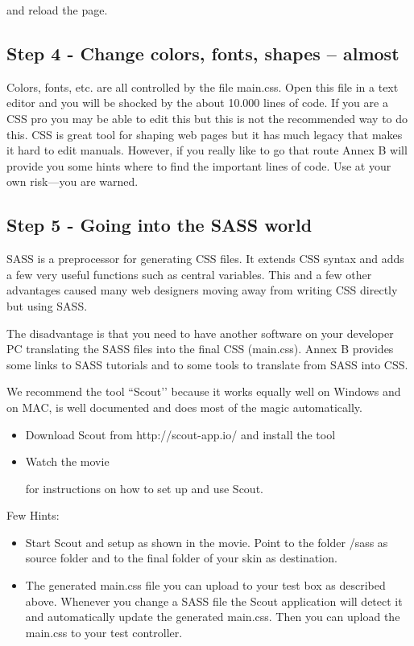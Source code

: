 and reload the page.

\subsection{Step 4 - Change colors, fonts, shapes – almost}

Colors, fonts, etc. are all controlled by the file main.css. Open this file in a text 
editor and you will be shocked by the about 10.000 lines of code. If you are a CSS pro 
you may be able to edit this but this is not the recommended way to do this. CSS is great
 tool for shaping web pages but it has much legacy that makes it hard to edit manuals.
However, if you really like to go that route Annex B will provide you some hints where to 
find the important lines of code. Use at your own risk---you are warned.


\subsection{Step 5 - Going into the SASS world}

SASS is a preprocessor for generating CSS files. It extends CSS syntax and adds a few 
very useful functions such as central variables. This and a few other advantages caused 
many web designers moving away from writing CSS directly but using SASS.

The disadvantage is that you need to have another software on your developer PC 
translating the SASS files into the final CSS (main.css). Annex B provides some links to 
SASS tutorials and to some tools to translate from SASS into CSS.

We recommend the tool ``Scout’’ because it works equally well on Windows and on MAC, 
is well documented and does most of the magic automatically.

\begin{itemize}
\item Download Scout from http://scout-app.io/ and install the tool
\item Watch the movie


for instructions on how to set up and use Scout.
\end{itemize}

Few Hints:

\begin{itemize}
\item Start Scout and setup as shown in the movie. Point to the folder /sass as source 
folder and to the final folder of your skin as destination.
\item The generated main.css file you can upload to your test box as described above. 
Whenever you change a SASS file the Scout application will detect it and automatically 
update the generated main.css. Then you can upload the main.css to your test controller.
\end{itemize}

